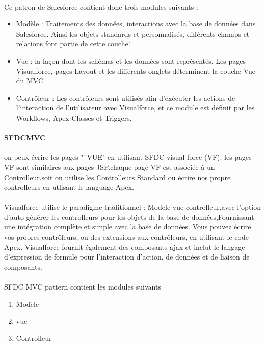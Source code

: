\documentclass[a4paper, 12pt]{report}
\begin{document}
\begin{itemize}
\paragraph{}Ce patron de Salesforce contient donc trois modules suivants :
\begin{itemize}
	\item {Modèle :} Traitements des données, interactions avec la base de données dans
Salesforce. Ainsi les objets standards et personnalisés, différents champs et relations font partie de cette couche.`
\item{Vue :} la façon dont les schémas et les données sont représentés. Les pages
Visualforce, pages Layout et les différents onglets déterminent la couche Vue
du MVC
\item{Contrôleur :} Les contrôleurs sont utilisés afin d'exécuter les actions de l'interaction de l'utilisateur avec Visualforce, et ce module est définit par les
Workflows, Apex Classes et Triggers.
\end{itemize}

\paragraph{SFDC\foornotemark[1] MVC }
on peux écrire les pages "`VUE" en utilisant SFDC visual force (VF). les pages VF sont similaires aux pages JSP.chaque page VF est associée à un Controlleur.soit on utilise les Controlleurs Standard ou écrire nos propre controlleurs en utlisant le language Apex. 
\paragraph{}
Visualforce utilise le paradigme traditionnel : Modele-vue-controlleur,avec l'option d'auto-générer les controlleurs pour les objets de la base de données,Fournissant une intégration complète et simple avec la base de données. Vous pouvez écrire vos propres contrôleurs, ou des extensions aux contrôleurs, en utilisant le code Apex. Visualforce fournit également des composants ajax et inclut le langage d'expression de formule pour l'interaction d'action, de données et de liaison de composants.
\paragraph{}
SFDC MVC pattern contient les modules suivants 
\begin{enumerate}
	\item Modèle 
	\item vue
	\item Controlleur
\end{enumerate}

\end{itemize}
\end{document}
